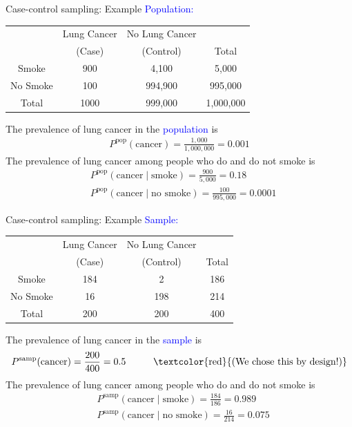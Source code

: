\documentclass[10pt,t]{beamer}
\newcommand\tab[1][1cm]{\hspace*{#1}}
\begin{document}
\begin{frame}{Case-control sampling: Example}
	\vspace{-0.3cm}
	\textcolor{blue}{Population:}
	\begin{center}
	\begin{table}
		\begin{tabular}{|c|cc|c|}
			\hline 
			& Lung Cancer & No Lung Cancer &  \\ 
			& (Case) & (Control) & Total  \\
			\hline 
			Smoke & 900 & 4,100  & 5,000 \\ 
			No Smoke & 100 & 994,900 & 995,000  \\ 
			\hline 
			Total & 1000 & 999,000 & 1,000,000 \\ 
			\hline 
		\end{tabular}
	\end{table}
\end{center} 
The prevalence of lung cancer in the \textcolor{blue}{population} is
\begin{align*}
	P^{\text{pop}}(\text{cancer}) = \frac{1,000}{1,000,000} = 0.001
\end{align*} 
The prevalence of lung cancer among people who do and do not smoke is
\begin{align*}
	&P^{\text{pop}}(\text{cancer} \mid \text{smoke}) = \frac{900}{5,000} = 0.18\\
	&P^{\text{pop}}(\text{cancer} \mid \text{no smoke}) = \frac{100}{995,000} = 0.0001
\end{align*}
\end{frame}

\begin{frame}{Case-control sampling: Example}
	\vspace{-0.3cm}
	\textcolor{blue}{Sample:}
		\begin{center}
	\begin{table}
		\begin{tabular}{|c|cc|c|}
			\hline 
			& Lung Cancer & No Lung Cancer &  \\ 
			& (Case) & (Control) & Total  \\
			\hline 
			Smoke & 184 & 2  & 186 \\ 
			No Smoke & 16 & 198 & 214  \\ 
			\hline 
			Total & 200 & 200 & 400 \\ 
			\hline 
		\end{tabular}
	\end{table}
\end{center} 
	The prevalence of lung cancer in the \textcolor{blue}{sample} is
	\begin{align*}
		P^{\text{samp}}(\text{cancer}) = \frac{200}{400} = 0.5 \tab \text{\textcolor{red}{(We chose this by design!)}}
	\end{align*} 
	The prevalence of lung cancer among people who do and do not smoke is
	\begin{align*}
		&P^{\text{samp}}(\text{cancer} \mid \text{smoke}) = \frac{184}{186} = 0.989\\
		&P^{\text{samp}}(\text{cancer} \mid \text{no smoke}) = \frac{16}{214} = 0.075
	\end{align*}
\end{frame}
\end{document}
